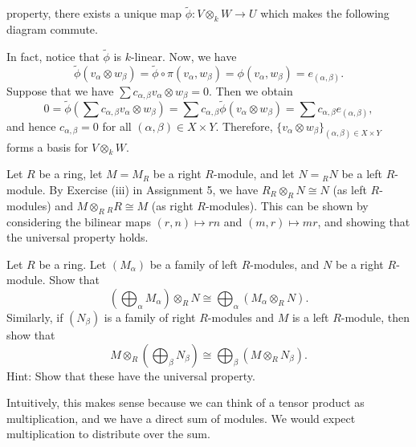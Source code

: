 \begin{pf}
    property, there exists a unique map $\tilde\phi : V \otimes_k W \to U$ 
    which makes the following diagram commute. 
    \begin{center}
    \end{center}
    In fact, notice that $\tilde\phi$ is $k$-linear. Now, we have 
    \[ \tilde\phi(v_\alpha \otimes w_\beta) = \tilde\phi \circ \pi(v_\alpha, 
    w_\beta) = \phi(v_\alpha, w_\beta) = e_{(\alpha, \beta)}. \] 
    Suppose that we have $\sum c_{\alpha, \beta} v_\alpha \otimes w_\beta = 0$. 
    Then we obtain 
    \[ 0 = \tilde\phi \left( \sum c_{\alpha,\beta} v_\alpha \otimes w_\beta \right) 
    = \sum c_{\alpha,\beta} \tilde\phi(v_\alpha \otimes w_\beta) = 
    \sum c_{\alpha,\beta} e_{(\alpha,\beta)}, \] 
    and hence $c_{\alpha,\beta} = 0$ for all $(\alpha, \beta) \in X \times Y$. 
    Therefore, $\{v_\alpha \otimes w_\beta\}_{(\alpha, \beta) \in X \times Y}$ 
    forms a basis for $V \otimes_k W$. 
\end{pf}

Let $R$ be a ring, let $M = M_R$ be a right $R$-module, and let $N = {}_R N$ 
be a left $R$-module. By Exercise (iii) in Assignment 5, we have $R_R \otimes_R N 
\cong N$ (as left $R$-modules) and $M \otimes_R {}_R R \cong M$ (as 
right $R$-modules). This can be shown by considering the bilinear maps 
$(r, n) \mapsto rn$ and $(m, r) \mapsto mr$, and showing that the universal
property holds. 

\begin{exercise}{}
    Let $R$ be a ring. Let $(M_\alpha)$ be a family of left $R$-modules, 
    and $N$ be a right $R$-module. Show that 
    \[ \left( \bigoplus_\alpha M_\alpha \right) \otimes_R N \cong 
    \bigoplus_{\alpha} (M_\alpha \otimes_R N). \] 
    Similarly, if $(N_\beta)$ is a family of right $R$-modules and $M$ 
    is a left $R$-module, then show that 
    \[ M \otimes_R \left( \bigoplus_\beta N_\beta \right) \cong 
    \bigoplus_\beta (M \otimes_R N_\beta). \] 
    Hint: Show that these have the universal property. 
\end{exercise}

Intuitively, this makes sense because we can think of a tensor product as 
multiplication, and we have a direct sum of modules. We would expect 
multiplication to distribute over the sum. 

